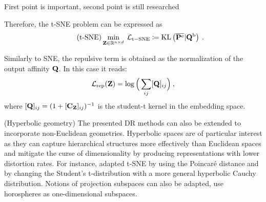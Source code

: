 \begin{remark}
    First point is important, second point is still researched 
\end{remark}

Therefore, the t-SNE problem can be expressed as
\begin{align}\label{eq:t-SNE_pb}\tag{t-SNE}
    \min_{\mathbf{Z} \in \mathbb{R}^{n \times d}} \: \mathcal{L}_{\mathrm{t-SNE}} \coloneqq \operatorname{KL}\left(\overline{{\mathbf{P}}^{\mathrm{e}}} | {\mathbf{Q}}^{\mathrm{b}}\right) \:.
\end{align}

Similarly to SNE, the repulsive term is obtained as the normalization of the output affinity ${\mathbf{Q}}$. In this case it reads:
\begin{align}
    \mathcal{L}_{\mathrm{rep}}({\mathbf{Z}}) = \log \Big(\sum_{ij} [{\mathbf{Q}}]_{ij} \Big) \:,
\end{align}
where $[{\mathbf{Q}}]_{ij} = (1 + [\mathbf{C}_{\mathbf{Z}}]_{ij})^{-1}$ is the student-t kernel in the embedding space.

\begin{remark}{(Hyperbolic geometry)} 
The presented DR methods can also be extended to incorporate non-Euclidean geometries. Hyperbolic spaces \citep{Chami21, Fan_2022_CVPR, Guo22, Lin23} are of particular interest as they can capture hierarchical structures more effectively than Euclidean spaces and mitigate the curse of dimensionality by producing representations with lower distortion rates. 
For instance, \citet{Guo22} adapted t-SNE by using the Poincaré distance and by changing the Student's t-distribution with a more general hyperbolic Cauchy distribution.  Notions of projection subspaces can also be adapted, \eg \citet{Chami21} use horospheres as one-dimensional subspaces. 
\end{remark}

